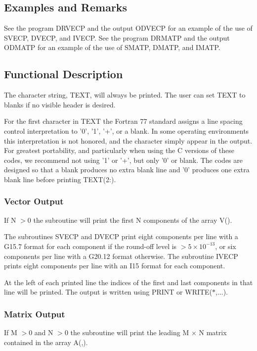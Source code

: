 \documentclass[twoside]{MATH77}
\begin{document}
\subsection{Examples and Remarks}

See the program DRVECP and the output ODVECP for an example of the use of
SVECP, DVECP, and IVECP. See the program DRMATP and the output ODMATP for an
example of the use of SMATP, DMATP, and IMATP.

\subsection{Functional Description}

The character string, TEXT, will always be printed. The user can set TEXT to
blanks if no visible header is desired.

For the first character in TEXT the Fortran 77 standard assigns a line spacing
control interpretation to '0', '1', '+', or a blank.  In some operating
environments this interpretation is not honored, and the character simply
appear in the output.  For greatest portability, and particularly when using
the C versions of these codes, we recommend not using '1' or '+', but only
'0' or blank.  The codes are designed so that a blank produces no extra
blank line and '0' produces one extra blank line before printing TEXT(2:).

\subsubsection{Vector Output}

If N $> 0$ the subroutine will print the first N components of the array V().

The subroutines SVECP and DVECP print eight components per line with a
G15.7 format for each component if the round-off level is $> 5 \times
10^{-13}$, or six components per line with a G20.12 format otherwise.
The subroutine IVECP prints eight components
per line with an I15 format for each component.

At the left of each printed line the indices of the first and last
components in that line will be printed.  The output is written using
PRINT or WRITE($*$,...).

\subsubsection{Matrix Output}

If M $> 0$ and N $> 0$ the subroutine will print the leading M $\times $ N
matrix contained in the array A(,).
\end{document}
